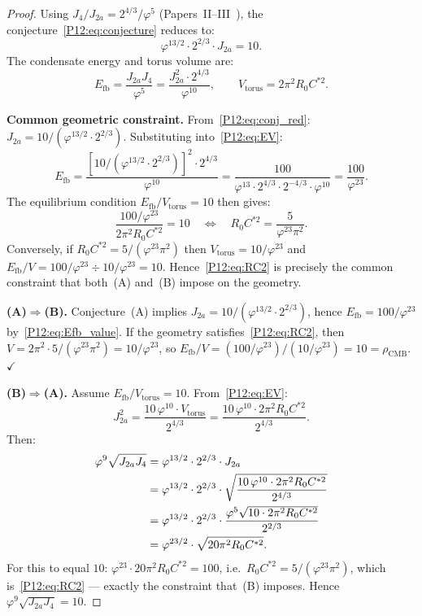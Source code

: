 \documentclass[11pt,a4paper]{article}
\theoremstyle{definition}
\theoremstyle{remark}
\newcommand{\vp}{\varphi}
\newcommand{\Efb}{E_{\mathrm{fb}}}
\newcommand{\Ja}{J_{2a}}
\newcommand{\Jfour}{J_{4}}
\newcommand{\rCMB}{\rho_{\mathrm{CMB}}}
\begin{document}
\begin{proof}
Using $\Jfour/\Ja=2^{4/3}/\vp^5$ (Papers~II--III~\cite{Paper2,Paper3}),
the conjecture~\eqref{P12:eq:conjecture} reduces to:
\begin{equation}
  \vp^{13/2}\cdot2^{2/3}\cdot\Ja = 10.
  \label{P12:eq:conj_red}
\end{equation}
The condensate energy and torus volume are:
\begin{equation}
  \Efb = \frac{\Ja\Jfour}{\vp^5}
       = \frac{\Ja^2\cdot2^{4/3}}{\vp^{10}},
  \qquad
  V_{\mathrm{torus}} = 2\pi^2 R_0 C^{*2}.
  \label{P12:eq:EV}
\end{equation}

\medskip
\textbf{Common geometric constraint.}
From~\eqref{P12:eq:conj_red}: $\Ja = 10/(\vp^{13/2}\cdot2^{2/3})$.
Substituting into~\eqref{P12:eq:EV}:
\begin{equation}
  \Efb = \frac{[10/(\vp^{13/2}\cdot2^{2/3})]^2\cdot2^{4/3}}{\vp^{10}}
       = \frac{100}{\vp^{13}\cdot2^{4/3}\cdot2^{-4/3}\cdot\vp^{10}}
       = \frac{100}{\vp^{23}}.
  \label{P12:eq:Efb_value}
\end{equation}
The equilibrium condition $\Efb/V_{\mathrm{torus}}=10$ then gives:
\begin{equation}
  \frac{100/\vp^{23}}{2\pi^2 R_0 C^{*2}} = 10
  \quad\Longleftrightarrow\quad
  R_0 C^{*2} = \frac{5}{\vp^{23}\pi^2}.
  \label{P12:eq:RC2_derivation}
\end{equation}
Conversely, if $R_0 C^{*2}=5/(\vp^{23}\pi^2)$ then
$V_{\mathrm{torus}}=10/\vp^{23}$ and $\Efb/V=100/\vp^{23}\div10/\vp^{23}=10$.
Hence~\eqref{P12:eq:RC2} is precisely the common constraint
that both~(A) and~(B) impose on the geometry.

\medskip
\textbf{(A)$\Rightarrow$(B).}
Conjecture~(A) implies $\Ja=10/(\vp^{13/2}\cdot2^{2/3})$,
hence $\Efb=100/\vp^{23}$ by~\eqref{P12:eq:Efb_value}.
If the geometry satisfies~\eqref{P12:eq:RC2}, then
$V=2\pi^2\cdot5/(\vp^{23}\pi^2)=10/\vp^{23}$,
so $\Efb/V = (100/\vp^{23})/(10/\vp^{23}) = 10 = \rCMB$. $\checkmark$

\medskip
\textbf{(B)$\Rightarrow$(A).}
Assume $\Efb/V_{\mathrm{torus}}=10$.
From~\eqref{P12:eq:EV}:
\begin{equation}
  \Ja^2 = \frac{10\,\vp^{10}\cdot V_{\mathrm{torus}}}{2^{4/3}}
        = \frac{10\,\vp^{10}\cdot 2\pi^2 R_0 C^{*2}}{2^{4/3}}.
  \label{P12:eq:Ja_sq_from_B}
\end{equation}
Then:
\begin{align}
  \vp^9\sqrt{\Ja\Jfour}
  &= \vp^{13/2}\cdot2^{2/3}\cdot\Ja \notag\\
  &= \vp^{13/2}\cdot2^{2/3}
     \cdot\sqrt{\frac{10\,\vp^{10}\cdot 2\pi^2 R_0 C^{*2}}{2^{4/3}}} \notag\\
  &= \vp^{13/2}\cdot2^{2/3}\cdot
     \frac{\vp^5\sqrt{10\cdot 2\pi^2 R_0 C^{*2}}}{2^{2/3}} \notag\\
  &= \vp^{23/2}\cdot\sqrt{20\pi^2 R_0 C^{*2}}.
  \label{P12:eq:Bimplies}
\end{align}
For this to equal $10$: $\vp^{23}\cdot20\pi^2 R_0 C^{*2}=100$,
i.e.\ $R_0 C^{*2}=5/(\vp^{23}\pi^2)$,
which is~\eqref{P12:eq:RC2} --- exactly the constraint that~(B) imposes.
Hence $\vp^9\sqrt{\Ja\Jfour}=10$.
\end{proof}
\end{document}
